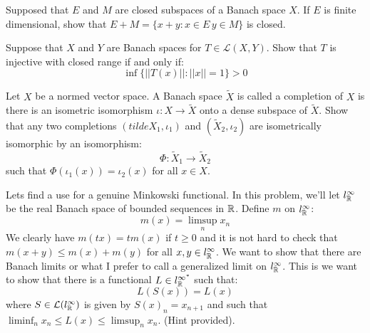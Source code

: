\documentclass[12pt]{article}
\begin{document}
\begin{problem}{34}
    Supposed that $E$ and $M$ are closed subspaces of a Banach space $X$. If $E$ is finite dimensional, show that $E+M = \{x+y: x \in E \, y \in M\}$ is closed. 
\end{problem}
\begin{solution} 

\end{solution}
\newpage 

\begin{problem}{35}
    Suppose that $X$ and $Y$ are Banach spaces for $T \in \mathcal{L}(X, Y)$. Show that $T$ is injective with closed range if and only if: 
    \[ \inf \{||T(x)|| : ||x|| = 1\} > 0 \]
\end{problem}
\begin{solution} 

\end{solution}
\newpage 


\begin{problem}{38}
    Let $X$ be a normed vector space. A Banach space $\tilde{X}$ is called a completion of $X$ is there is an isometric isomorphism $\iota: X \to \tilde{X}$ onto a dense subspace of $\tilde{X}$. Show that any two completions $(tilde{X}_1, \iota_1)$ and $(\tilde{X}_2, \iota_2)$ are isometrically isomorphic by an isomorphism: 
    \[ \Phi: \tilde{X}_1 \to \tilde{X}_2\]
    such that $\Phi(\iota_1(x)) = \iota_2(x)$ for all $x \in X$. 
\end{problem}
\begin{solution} 

\end{solution}
\newpage 

\begin{problem}{39}
    Lets find a use for a genuine Minkowski functional. In this problem, we'll let $l_\mathbb R^\infty$ be the real Banach space of bounded sequences in $\mathbb R$. Define $m$ on $l_\mathbb R^\infty$: 
    \[ m(x) = \limsup_n x_n\]
    We clearly have $m(tx) = tm(x)$ if $t \geq 0$ and it is not hard to check that $m(x+y) \leq m(x) + m(y)$ for all $x, y \in l_\mathbb R^\infty$. We want to show that there are Banach limits or what I prefer to call a generalized limit on $l_\mathbb R^\infty$. This is we want to show that there is a functional $L \in l_\mathbb R^{\infty^*}$ such that:
    \[ L(S(x)) = L(x)\] 
    where $S \in \mathcal{L}(l_\mathbb R^\infty)$ is given by $S(x)_n = x_{n+1}$ and such that $\liminf_n x_n \leq L(x) \leq \limsup_n x_n$. (Hint provided).
\end{problem}
\begin{solution} 

\end{solution}
\newpage 
\end{document}
